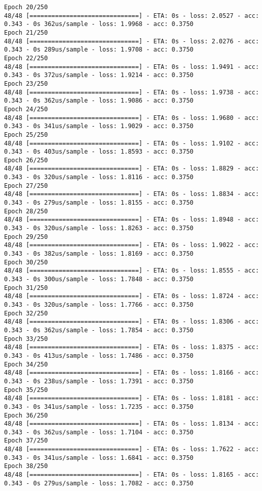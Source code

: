 \documentclass[11pt]{article}
\begin{document}
\begin{Verbatim}[commandchars=\\\{\}]
Epoch 20/250
48/48 [==============================] - ETA: 0s - loss: 2.0527 - acc: 0.343 - 0s 362us/sample - loss: 1.9968 - acc: 0.3750
Epoch 21/250
48/48 [==============================] - ETA: 0s - loss: 2.0276 - acc: 0.343 - 0s 289us/sample - loss: 1.9708 - acc: 0.3750
Epoch 22/250
48/48 [==============================] - ETA: 0s - loss: 1.9491 - acc: 0.343 - 0s 372us/sample - loss: 1.9214 - acc: 0.3750
Epoch 23/250
48/48 [==============================] - ETA: 0s - loss: 1.9738 - acc: 0.343 - 0s 362us/sample - loss: 1.9086 - acc: 0.3750
Epoch 24/250
48/48 [==============================] - ETA: 0s - loss: 1.9680 - acc: 0.343 - 0s 341us/sample - loss: 1.9029 - acc: 0.3750
Epoch 25/250
48/48 [==============================] - ETA: 0s - loss: 1.9102 - acc: 0.343 - 0s 403us/sample - loss: 1.8593 - acc: 0.3750
Epoch 26/250
48/48 [==============================] - ETA: 0s - loss: 1.8829 - acc: 0.343 - 0s 320us/sample - loss: 1.8116 - acc: 0.3750
Epoch 27/250
48/48 [==============================] - ETA: 0s - loss: 1.8834 - acc: 0.343 - 0s 279us/sample - loss: 1.8155 - acc: 0.3750
Epoch 28/250
48/48 [==============================] - ETA: 0s - loss: 1.8948 - acc: 0.343 - 0s 320us/sample - loss: 1.8263 - acc: 0.3750
Epoch 29/250
48/48 [==============================] - ETA: 0s - loss: 1.9022 - acc: 0.343 - 0s 382us/sample - loss: 1.8169 - acc: 0.3750
Epoch 30/250
48/48 [==============================] - ETA: 0s - loss: 1.8555 - acc: 0.343 - 0s 300us/sample - loss: 1.7848 - acc: 0.3750
Epoch 31/250
48/48 [==============================] - ETA: 0s - loss: 1.8724 - acc: 0.343 - 0s 320us/sample - loss: 1.7766 - acc: 0.3750
Epoch 32/250
48/48 [==============================] - ETA: 0s - loss: 1.8306 - acc: 0.343 - 0s 362us/sample - loss: 1.7854 - acc: 0.3750
Epoch 33/250
48/48 [==============================] - ETA: 0s - loss: 1.8375 - acc: 0.343 - 0s 413us/sample - loss: 1.7486 - acc: 0.3750
Epoch 34/250
48/48 [==============================] - ETA: 0s - loss: 1.8166 - acc: 0.343 - 0s 238us/sample - loss: 1.7391 - acc: 0.3750
Epoch 35/250
48/48 [==============================] - ETA: 0s - loss: 1.8181 - acc: 0.343 - 0s 341us/sample - loss: 1.7235 - acc: 0.3750
Epoch 36/250
48/48 [==============================] - ETA: 0s - loss: 1.8134 - acc: 0.343 - 0s 362us/sample - loss: 1.7104 - acc: 0.3750
Epoch 37/250
48/48 [==============================] - ETA: 0s - loss: 1.7622 - acc: 0.343 - 0s 341us/sample - loss: 1.6841 - acc: 0.3750
Epoch 38/250
48/48 [==============================] - ETA: 0s - loss: 1.8165 - acc: 0.343 - 0s 279us/sample - loss: 1.7082 - acc: 0.3750

\end{Verbatim}
\end{document}

